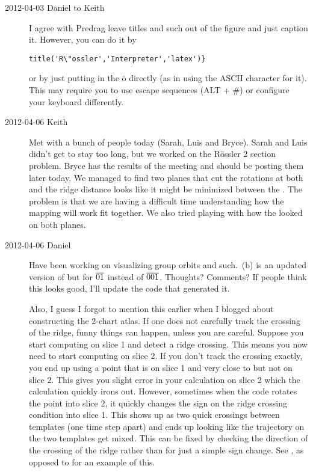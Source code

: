\begin{description}
\item[2012-04-03 Daniel to Keith] I agree with Predrag leave titles and
such out of the figure and just caption it. However, you can do it by
\begin{verbatim}
title('R\"ossler','Interpreter','latex')}
\end{verbatim}
or by just putting in the \"o directly (as in using the
ASCII character for it). This may require you to use escape sequences
(ALT + \#) or configure your keyboard differently.

\item[2012-04-06 Keith]
Met with a bunch of people today (Sarah, Luis and Bryce).  Sarah and Luis
didn't get to stay too long, but we worked on the R\"ossler 2 section
problem.  Bryce has the results of the meeting and should be posting them
later today.  We managed to find two planes that cut the rotations at
both {\eqv} and the ridge distance looks like it might be minimized
between the {\eqv}.  The problem is that we are having a difficult
time understanding how the mapping will work fit together.  We also tried
playing with how the {\poincBord} looked on both planes.

\item[2012-04-06 Daniel]
Have been working on visualizing group orbits and such.
\,(b) is an updated version of 
but for $\overline{01}$ instead of $\overline{001}$. Thoughts? Comments?
If people think this looks good, I'll update the code that generated it.

Also, I guess I forgot to mention this earlier when I blogged about
constructing the 2-chart atlas. If one does not carefully track the
crossing of the ridge, funny things can happen, unless you are careful.
Suppose you start computing on slice 1 and detect a ridge crossing. This
means you now need to start computing on slice 2. If you don't track the
crossing exactly, you end up using a point that is on slice 1 and very
close to but not on slice 2. This gives you slight error in your
calculation on slice 2 which the calculation quickly irons out. However,
sometimes when the code rotates the point into slice 2, it quickly
changes the sign on the ridge crossing condition into slice 1. This shows
up as two quick crossings between templates (one time step apart) and
ends up looking like the trajectory on the two templates get mixed. This
can be fixed by checking the direction of the crossing of the ridge
rather than for just a simple sign change. See ,
as opposed to   for an example of this.


\end{description}
